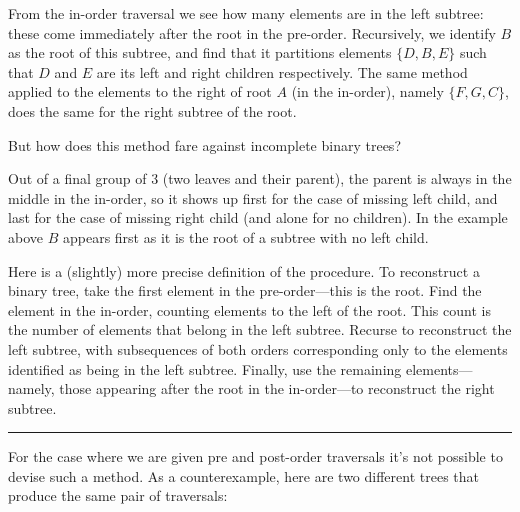 \documentclass{report}
\newcommand{\okthen}{\rule[-1.4pt]{0.3em}{0.77em}}
\begin{document}
From the in-order traversal we see how many elements are in the left subtree: these come immediately after the root in the pre-order. Recursively, we identify $B$ as the root of this subtree, and find that it partitions elements $\{D,B,E\}$ such that $D$ and $E$ are its left and right children respectively. The same method applied to the elements to the right of root $A$ (in the in-order), namely $\{F,G,C\}$, does the same for the right subtree of the root.

But how does this method fare against incomplete binary trees?
\begin{center}
\end{center}
Out of a final group of 3 (two leaves and their parent), the parent is always in the middle in the in-order, so it shows up first for the case of missing left child, and last for the case of missing right child (and alone for no children). In the example above %
$B$ appears first as it is the root of a subtree with no left child.

\smallskip

Here is a (slightly) more precise definition of the procedure. To reconstruct a binary tree, take the first element in the pre-order---this is the root. Find the element in the in-order, counting elements to the left of the root. This count is the number of elements that belong in the left subtree. Recurse to reconstruct the left subtree, with subsequences of both orders corresponding only to the elements identified as being in the left subtree. Finally, use the remaining elements---namely, those appearing after the root in the in-order---to reconstruct the right subtree.\ \okthen

\smallskip

For the case where we are given pre and post-order traversals it's not possible to devise such a method. As a counterexample, here are two different trees that produce the same pair of traversals:
\begin{center}
\hspace{.7cm}
\end{center}
\end{document}
